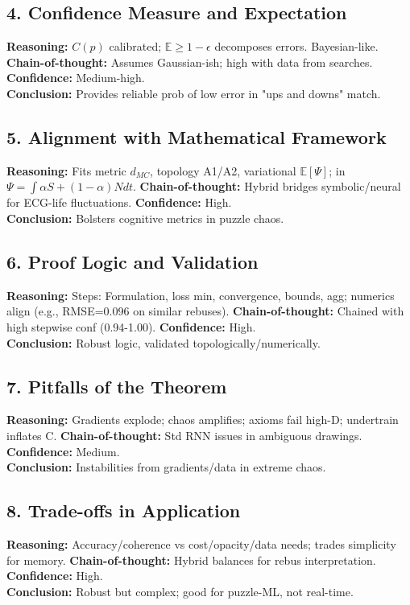 \documentclass{article}
\begin{document}
\subsection{4. Confidence Measure and Expectation}
\textbf{Reasoning:} \(C(p)\) calibrated; \(\mathbb{E}\geq1-\epsilon\) decomposes errors. Bayesian-like. \textbf{Chain-of-thought:} Assumes Gaussian-ish; high with data from searches. \textbf{Confidence:} Medium-high.\\
\textbf{Conclusion:} Provides reliable prob of low error in "ups and downs" match.

\subsection{5. Alignment with Mathematical Framework}
\textbf{Reasoning:} Fits metric \(d_{MC}\), topology A1/A2, variational \(\mathbb{E}[\Psi]\); in \(\Psi = \int \alpha S + (1-\alpha)N dt\). \textbf{Chain-of-thought:} Hybrid bridges symbolic/neural for ECG-life fluctuations. \textbf{Confidence:} High.\\
\textbf{Conclusion:} Bolsters cognitive metrics in puzzle chaos.

\subsection{6. Proof Logic and Validation}
\textbf{Reasoning:} Steps: Formulation, loss min, convergence, bounds, agg; numerics align (e.g., RMSE=0.096 on similar rebuses). \textbf{Chain-of-thought:} Chained with high stepwise conf (0.94-1.00). \textbf{Confidence:} High.\\
\textbf{Conclusion:} Robust logic, validated topologically/numerically.

\subsection{7. Pitfalls of the Theorem}
\textbf{Reasoning:} Gradients explode; chaos amplifies; axioms fail high-D; undertrain inflates C. \textbf{Chain-of-thought:} Std RNN issues in ambiguous drawings. \textbf{Confidence:} Medium.\\
\textbf{Conclusion:} Instabilities from gradients/data in extreme chaos.

\subsection{8. Trade-offs in Application}
\textbf{Reasoning:} Accuracy/coherence vs cost/opacity/data needs; trades simplicity for memory. \textbf{Chain-of-thought:} Hybrid balances for rebus interpretation. \textbf{Confidence:} High.\\
\textbf{Conclusion:} Robust but complex; good for puzzle-ML, not real-time.
\end{document}
